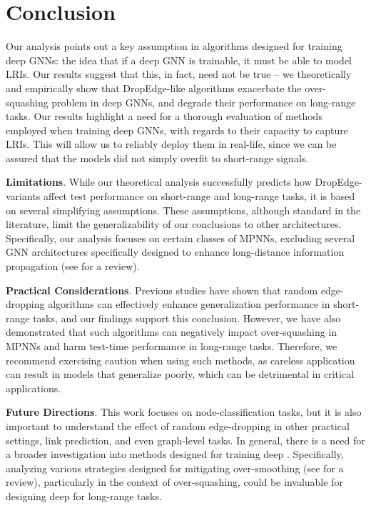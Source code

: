 \section{Conclusion}

Our analysis points out a key assumption in algorithms designed for training deep GNNs: the idea that if a deep GNN is trainable, it must be able to model LRIs. %
Our results suggest that this, in fact, need not be true -- we theoretically and empirically show that DropEdge-like algorithms exacerbate the over-squashing problem in deep GNNs, and degrade their performance on long-range tasks. Our results highlight a need for a thorough evaluation of methods employed when training deep GNNs, with regards to their capacity to capture LRIs. This will allow us to reliably deploy them in real-life, since we can be assured that the models did not simply overfit to short-range signals.

\textbf{Limitations}. While our theoretical analysis successfully predicts how DropEdge-variants affect test performance on short-range and long-range tasks, it is based on several simplifying assumptions. These assumptions, although standard in the literature, limit the generalizability of our conclusions to other architectures. Specifically, our analysis focuses on certain classes of MPNNs, excluding several GNN architectures specifically designed to enhance long-distance information propagation (see \citet{akansha2024oversquashinggraphneuralnetworks} for a review). %

\textbf{Practical Considerations}. Previous studies have shown that random edge-dropping algorithms can effectively enhance generalization performance in short-range tasks, and our findings support this conclusion. However, we have also demonstrated that such algorithms can negatively impact over-squashing in MPNNs and harm test-time performance in long-range tasks. Therefore, we recommend exercising caution when using such methods, as careless application can result in models that generalize poorly, which can be detrimental in critical applications.

\textbf{Future Directions}. This work focuses on node-classification tasks, but it is also important to understand the effect of random edge-dropping in other practical settings, \eg link prediction, and even graph-level tasks. In general, there is a need for a broader investigation into methods designed for training deep . %
Specifically, analyzing various strategies designed for mitigating over-smoothing (see \citet{rusch2023surveyoversmoothinggraphneural} for a review), particularly in the context of over-squashing, could be invaluable for designing deep  for long-range tasks.